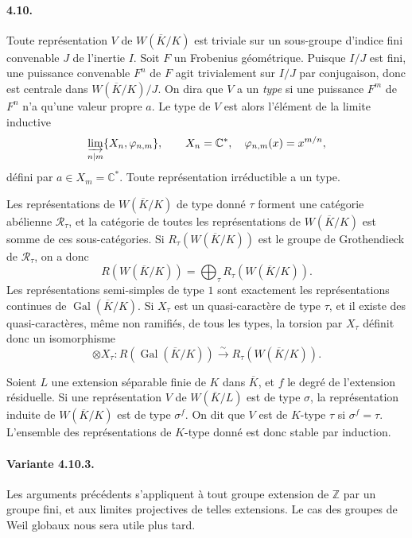 \documentclass[10pt,letterpaper]{article}
\newcommand{\C}{\mathbb C}
\newcommand{\Z}{\mathbb Z}
\newcommand{\Gal}{\operatorname{Gal}}
\newcommand{\iso}{\xrightarrow{\sim}}
\providecommand{\Gal}{\operatorname{Gal}}
\providecommand{\Gal}{\operatorname{Gal}}
\providecommand{\Gal}{\operatorname{Gal}}
\providecommand{\Gal}{\operatorname{Gal}}
\begin{document}
\paragraph{4.10.} Toute représentation \(V\) de \(W(\overline K/K)\) est triviale sur un sous-groupe d'indice fini convenable \(J\) de l'inertie \(I\). Soit \(F\) un Frobenius géométrique. Puisque \(I/J\) est fini, une puissance convenable \(F^n\) de \(F\) agit trivialement sur \(I/J\) par conjugaison, donc est centrale dans \(W(\overline K/K)/J\). On dira que \(V\) a un \emph{type} si une puissance \(F^m\) de \(F^n\) n'a qu'une valeur propre \(a\). Le type de \(V\) est alors l'élément de la limite inductive
\[
\varinjlim_{n\mid m}\{X_n,\varphi_{n,m}\},\qquad
X_n=\C^*,\quad \varphi_{n,m}(x)=x^{m/n},
\]
défini par \(a\in X_m=\C^*\). Toute représentation irréductible a un type.

Les représentations de \(W(\overline K/K)\) de type donné \(\tau\) forment une catégorie abélienne \(\mathcal R_\tau\), et la catégorie de toutes les représentations de \(W(\overline K/K)\) est somme de ces sous-catégories. Si \(R_\tau(W(\overline K/K))\) est le groupe de Grothendieck de \(\mathcal R_\tau\), on a donc
\[
\tag{4.10.1}
R(W(\overline K/K))=\bigoplus_\tau R_\tau(W(\overline K/K)).
\]
Les représentations semi-simples de type \(1\) sont exactement les représentations continues de \(\Gal(\overline K/K)\). Si \(X_\tau\) est un quasi-caractère de type \(\tau\), et il existe des quasi-caractères, même non ramifiés, de tous les types, la torsion par \(X_\tau\) définit donc un isomorphisme
\[
\tag{4.10.2}
\otimes X_\tau:R(\Gal(\overline K/K))\iso R_\tau(W(\overline K/K)).
\]

Soient \(L\) une extension séparable finie de \(K\) dans \(\overline K\), et \(f\) le degré de l'extension résiduelle. Si une représentation \(V\) de \(W(\overline K/L)\) est de type \(\sigma\), la représentation induite de \(W(\overline K/K)\) est de type \(\sigma^f\). On dit que \(V\) est de \(K\)-type \(\tau\) si \(\sigma^f=\tau\). L'ensemble des représentations de \(K\)-type donné est donc stable par induction.

\paragraph{Variante 4.10.3.} Les arguments précédents s'appliquent à tout groupe extension de \(\Z\) par un groupe fini, et aux limites projectives de telles extensions. Le cas des groupes de Weil globaux nous sera utile plus tard.
\end{document}
